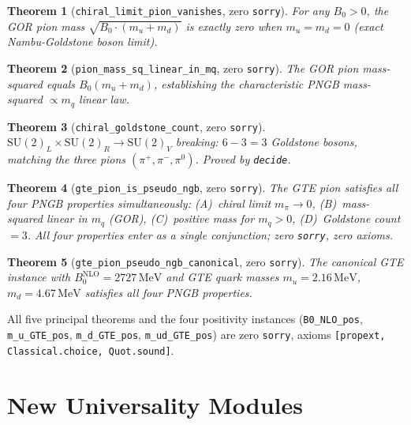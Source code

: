 \documentclass[11pt,a4paper]{article}
\newtheorem{theorem}{Theorem}[section]
\theoremstyle{definition}
\begin{document}
\begin{theorem}[\lstinline|chiral_limit_pion_vanishes|, zero \texttt{sorry}]
For any $B_0 > 0$, the GOR pion mass $\sqrt{B_0 \cdot (m_u + m_d)}$ is exactly
zero when $m_u = m_d = 0$ (exact Nambu-Goldstone boson limit).
\end{theorem}

\begin{theorem}[\lstinline|pion_mass_sq_linear_in_mq|, zero \texttt{sorry}]
The GOR pion mass-squared equals $B_0(m_u + m_d)$, establishing the
characteristic PNGB mass-squared $\propto m_q$ linear law.
\end{theorem}

\begin{theorem}[\lstinline|chiral_goldstone_count|, zero \texttt{sorry}]
$\mathrm{SU}(2)_L \times \mathrm{SU}(2)_R \to \mathrm{SU}(2)_V$ breaking:
$6 - 3 = 3$ Goldstone bosons, matching the three pions $(\pi^+, \pi^-, \pi^0)$.
Proved by \lstinline|decide|.
\end{theorem}

\begin{theorem}[\lstinline|gte_pion_is_pseudo_ngb|, zero \texttt{sorry}]
The GTE pion satisfies all four PNGB properties simultaneously: (A)~chiral limit
$m_\pi \to 0$, (B)~mass-squared linear in $m_q$ (GOR), (C)~positive mass for
$m_q > 0$, (D)~Goldstone count $= 3$.  All four properties enter as a single
conjunction; zero \texttt{sorry}, zero axioms.
\end{theorem}

\begin{theorem}[\lstinline|gte_pion_pseudo_ngb_canonical|, zero \texttt{sorry}]
The canonical GTE instance with $B_0^{\mathrm{NLO}} = 2727\,\mathrm{MeV}$
and GTE quark masses $m_u = 2.16\,\mathrm{MeV}$,
$m_d = 4.67\,\mathrm{MeV}$ satisfies all four PNGB properties.
\end{theorem}

All five principal theorems and the four positivity instances
(\lstinline|B0_NLO_pos|, \lstinline|m_u_GTE_pos|, \lstinline|m_d_GTE_pos|,
\lstinline|m_ud_GTE_pos|) are zero \texttt{sorry}, axioms
\texttt{[propext, Classical.choice, Quot.sound]}.

\section{New Universality Modules}\label{sec:new-universality}
\end{document}
